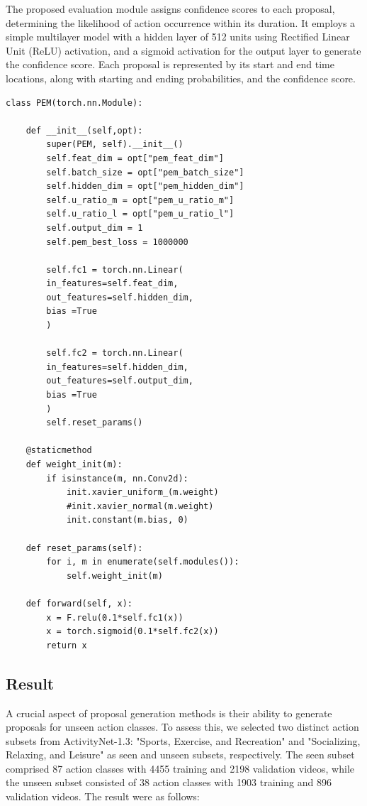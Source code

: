 The proposed evaluation module assigns confidence scores to each proposal, determining the likelihood of action occurrence within its duration. It employs a simple multilayer model with a hidden layer of 512 units using Rectified Linear Unit (ReLU) activation, and a sigmoid activation for the output layer to generate the confidence score. Each proposal is represented by its start and end time locations, along with starting and ending probabilities, and the confidence score.

\begin{lstlisting}[style=python]
class PEM(torch.nn.Module):
    
    def __init__(self,opt):
        super(PEM, self).__init__()
        self.feat_dim = opt["pem_feat_dim"]
        self.batch_size = opt["pem_batch_size"]
        self.hidden_dim = opt["pem_hidden_dim"]
        self.u_ratio_m = opt["pem_u_ratio_m"]
        self.u_ratio_l = opt["pem_u_ratio_l"]
        self.output_dim = 1
        self.pem_best_loss = 1000000
        
        self.fc1 = torch.nn.Linear(
        in_features=self.feat_dim,
        out_features=self.hidden_dim,
        bias =True
        )
        
        self.fc2 = torch.nn.Linear(
        in_features=self.hidden_dim,
        out_features=self.output_dim,
        bias =True
        )
        self.reset_params()

    @staticmethod
    def weight_init(m):
        if isinstance(m, nn.Conv2d):
            init.xavier_uniform_(m.weight)
            #init.xavier_normal(m.weight)
            init.constant(m.bias, 0)

    def reset_params(self):
        for i, m in enumerate(self.modules()):
            self.weight_init(m)

    def forward(self, x):
        x = F.relu(0.1*self.fc1(x))
        x = torch.sigmoid(0.1*self.fc2(x))
        return x
    \end{lstlisting}
\subsection{Result}
A crucial aspect of proposal generation methods is their ability to generate proposals for unseen action classes. To assess this, we selected two distinct action subsets from ActivityNet-1.3: "Sports, Exercise, and Recreation" and "Socializing, Relaxing, and Leisure" as seen and unseen subsets, respectively. The seen subset comprised 87 action classes with 4455 training and 2198 validation videos, while the unseen subset consisted of 38 action classes with 1903 training and 896 validation videos. The result were as follows:

